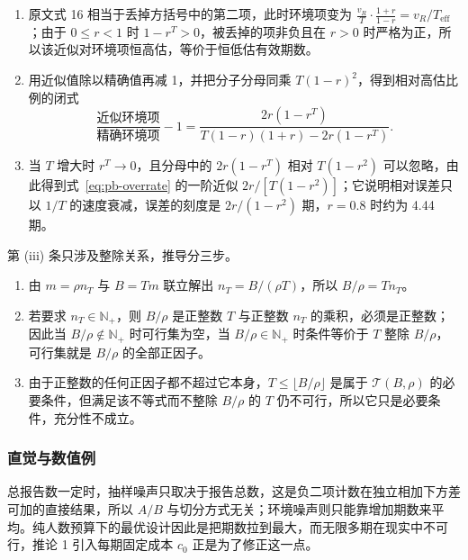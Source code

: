 \begin{enumerate}
\item 原文式 16 相当于丢掉方括号中的第二项，此时环境项变为 $\frac{v_R}{T}\cdot\frac{1+r}{1-r}=v_R/T_{\operatorname{eff}}$；由于 $0\le r<1$ 时 $1-r^T>0$，被丢掉的项非负且在 $r>0$ 时严格为正，所以该近似对环境项恒高估，等价于恒低估有效期数。
\item 用近似值除以精确值再减 1，并把分子分母同乘 $T(1-r)^2$，得到相对高估比例的闭式
\begin{equation}
\frac{\text{近似环境项}}{\text{精确环境项}}-1=\frac{2r(1-r^T)}{T(1-r)(1+r)-2r(1-r^T)} .\label{eq:pb-overrate}
\end{equation}
\item 当 $T$ 增大时 $r^T\to0$，且分母中的 $2r(1-r^T)$ 相对 $T(1-r^2)$ 可以忽略，由此得到式~\eqref{eq:pb-overrate} 的一阶近似 $2r/[T(1-r^2)]$；它说明相对误差只以 $1/T$ 的速度衰减，误差的刻度是 $2r/(1-r^2)$ 期，$r=0.8$ 时约为 4.44 期。
\end{enumerate}

第 (iii) 条只涉及整除关系，推导分三步。
\begin{enumerate}
\item 由 $m=\rho n_T$ 与 $B=Tm$ 联立解出 $n_T=B/(\rho T)$，所以 $B/\rho=Tn_T$。
\item 若要求 $n_T\in\mathbb N_+$，则 $B/\rho$ 是正整数 $T$ 与正整数 $n_T$ 的乘积，必须是正整数；因此当 $B/\rho\notin\mathbb N_+$ 时可行集为空，当 $B/\rho\in\mathbb N_+$ 时条件等价于 $T$ 整除 $B/\rho$，可行集就是 $B/\rho$ 的全部正因子。
\item 由于正整数的任何正因子都不超过它本身，$T\le\lfloor B/\rho\rfloor$ 是属于 $\mathcal T(B,\rho)$ 的必要条件，但满足该不等式而不整除 $B/\rho$ 的 $T$ 仍不可行，所以它只是必要条件，充分性不成立。
\end{enumerate}

\subsubsection{直觉与数值例}

总报告数一定时，抽样噪声只取决于报告总数，这是负二项计数在独立相加下方差可加的直接结果，所以 $A/B$ 与切分方式无关；环境噪声则只能靠增加期数来平均。纯人数预算下的最优设计因此是把期数拉到最大，而无限多期在现实中不可行，推论 1 引入每期固定成本 $c_0$ 正是为了修正这一点。

